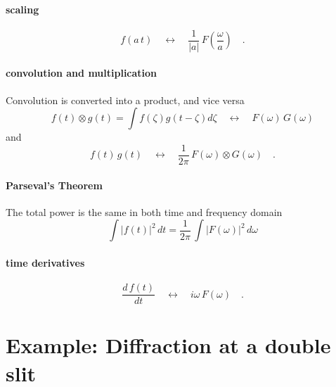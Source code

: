 \paragraph{scaling}  
\begin{equation}
 f( a \, t) \quad \leftrightarrow \quad 
\frac{1}{|a|} \, F \left( \frac{\omega}{a} \right)   \quad .
\end{equation}


\paragraph{convolution and multiplication} Convolution is converted into a product, and vice versa
\begin{equation}
 f(t) \otimes g(t) = \int f(\zeta) g(t- \zeta) d\zeta 
 \quad \leftrightarrow \quad 
 F(\omega) \, G(\omega)
\end{equation}
and
\begin{equation}
 f(t) \, g(t) 
 \quad \leftrightarrow \quad 
\frac{1}{2 \pi} \, F(\omega) \otimes G(\omega) \quad .
\end{equation}

\paragraph{Parseval's Theorem} The total power is the same in both time and frequency domain
\begin{equation}
 \int |f(t) |^2 \, dt = \frac{1}{2 \pi} \, \int | F (\omega ) | ^2 \, d\omega
\end{equation}

\paragraph{time derivatives}
\begin{equation}
 \frac{d \, f(t)}{dt} 
 \quad \leftrightarrow \quad 
i \omega \, F(\omega)  \quad .
\end{equation}


\section{Example: Diffraction at a double slit}

